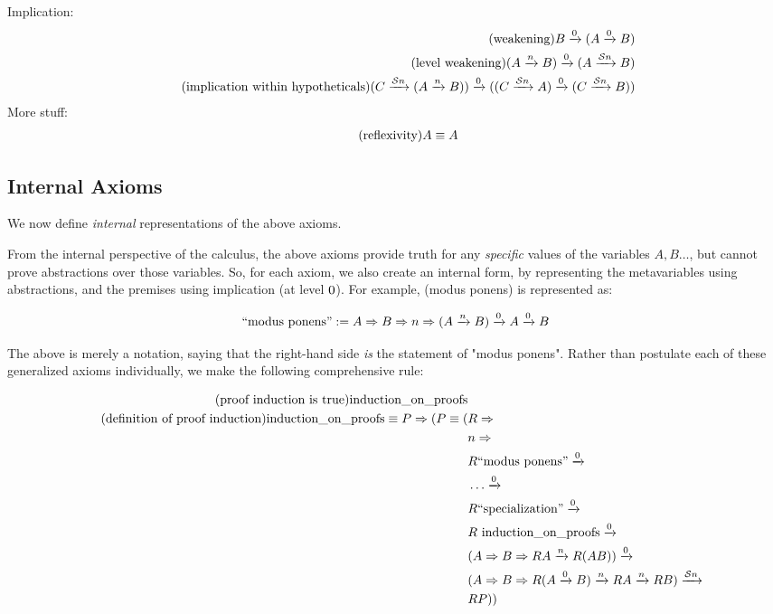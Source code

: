 \documentclass{article}
\begin{document}
  Implication:
  \begin{align*}
    \tag{weakening}
    B \xrightarrow{0} (A \xrightarrow{0} B)\\
    \tag{level weakening}
    (A \xrightarrow{n} B) \xrightarrow{0} (A \xrightarrow{\mathcal{S} n} B)\\
    \tag{implication within hypotheticals}
    (C \xrightarrow{\mathcal{S} n} (A \xrightarrow{n} B)) \xrightarrow{0} ((C \xrightarrow{\mathcal{S} n} A) \xrightarrow{0} (C \xrightarrow{\mathcal{S} n} B))\\
  \end{align*}
  More stuff:
  \begin{align*}
    \tag{reflexivity}\label{eq_refl}
    A &\equiv A\\
  \end{align*}

  \subsection{Internal Axioms}

  We now define \emph{internal} representations of the above axioms.

  From the internal perspective of the calculus, the above axioms provide truth for any \emph{specific} values of the variables $A, B\dots$, but cannot prove abstractions over those variables.
  So, for each axiom, we also create an internal form, by representing the metavariables using abstractions, and the premises using implication (at level $0$).
  For example, (modus ponens) is represented as:

  \begin{equation*}
    \mathrm{``modus\ ponens"} := A \Rightarrow B \Rightarrow n \Rightarrow (A \xrightarrow{n} B) \xrightarrow{0} A \xrightarrow{0} B
  \end{equation*}
  
  The above is merely a notation, saying that the right-hand side \emph{is} the statement of "modus ponens". Rather than postulate each of these generalized axioms individually, we make the following comprehensive rule:
  
  \setlength{\jot}{0em}
  \begin{align*}
    \tag{proof induction is true}\label{indt}
    \mathrm{induction\_on\_proofs}\\
    \tag{definition of proof induction}\label{indd}
    \mathrm{induction\_on\_proofs} \equiv P \Rightarrow (P \equiv (&R \Rightarrow\\
      &n \Rightarrow\\
      &R\mathrm{``modus\ ponens"} \xrightarrow{0}\\
      &\dots \xrightarrow{0}\\
      &R\mathrm{``specialization"} \xrightarrow{0}\\
      &R\ \mathrm{induction\_on\_proofs} \xrightarrow{0}\\
      &(A \Rightarrow B \Rightarrow RA\xrightarrow{n}R(AB)) \xrightarrow{0}\\
      &(A \Rightarrow B \Rightarrow R(A\xrightarrow{0}B)\xrightarrow{n}RA\xrightarrow{n}RB) \xrightarrow{\mathcal{S} n}\\
      &RP))\\
  \end{align*}
\end{document}
